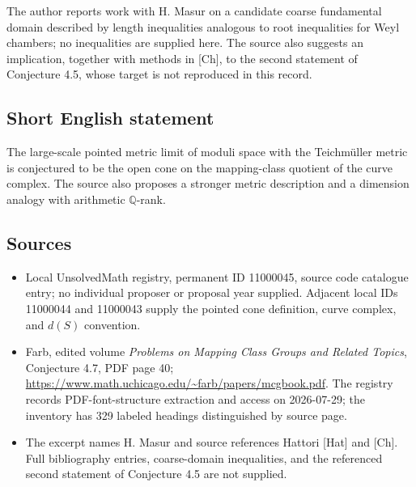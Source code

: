 \documentclass[11pt]{article}
\newcommand{\Q}{\mathbb{Q}}
\begin{document}
The author reports work with H. Masur on a candidate coarse fundamental domain described by length inequalities analogous to root inequalities for Weyl chambers; no inequalities are supplied here. The source also suggests an implication, together with methods in [Ch], to the second statement of Conjecture 4.5, whose target is not reproduced in this record.
\subsection{Short English statement}
The large-scale pointed metric limit of moduli space with the Teichm\"uller metric is conjectured to be the open cone on the mapping-class quotient of the curve complex. The source also proposes a stronger metric description and a dimension analogy with arithmetic $\Q$-rank.
\subsection{Sources}
\begin{itemize}
\item Local UnsolvedMath registry, permanent ID 11000045, source code catalogue entry; no individual proposer or proposal year supplied. Adjacent local IDs 11000044 and 11000043 supply the pointed cone definition, curve complex, and $d(S)$ convention.
\item Farb, edited volume \emph{Problems on Mapping Class Groups and Related Topics}, Conjecture 4.7, PDF page 40; \url{https://www.math.uchicago.edu/~farb/papers/mcgbook.pdf}. The registry records PDF-font-structure extraction and access on 2026-07-29; the inventory has 329 labeled headings distinguished by source page.
\item The excerpt names H. Masur and source references Hattori [Hat] and [Ch]. Full bibliography entries, coarse-domain inequalities, and the referenced second statement of Conjecture 4.5 are not supplied.
\end{itemize}
\end{document}
